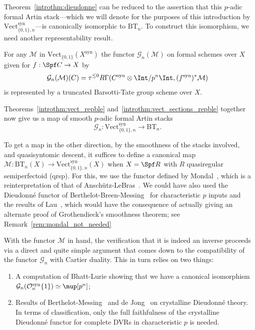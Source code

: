 \documentclass[10pt]{amsart}
\begin{document}
Theorem~\ref{introthm:dieudonne} can be reduced to the assertion that this $p$-adic formal Artin stack---which we will denote for the purposes of this introduction by $\mathrm{Vect}^{\mathrm{syn}}_{\{0,1\},n}$---is canonically isomorphic to $\mathrm{BT}_n$. To construct this isomorphism, we need another representability result.

\begin{introthm}
\label{introthm:vect_sections_repble}
For any $\mathcal{M}$ in $\mathrm{Vect}_{\{0,1\}}(X^{\mathrm{syn}})$ the functor $\mathcal{G}_n(\mathcal{M})$ on formal schemes over $X$ given for $f:\Spf C\to X$ by
\[
\mathcal{G}_n(\mathcal{M})(C) = \tau^{\le 0}R\Gamma(C^{\mathrm{syn}}\otimes\Int/p^n\Int,(f^{\mathrm{syn}})^*\mathcal{M})
\]
is represented by a truncated Barsotti-Tate group scheme over $X$.
\end{introthm} 

Theorems~\ref{introthm:vect_repble} and~\ref{introthm:vect_sections_repble} together now give us a map of smooth $p$-adic formal Artin stacks
\[
\mathcal{G}_n:\mathrm{Vect}^{\mathrm{syn}}_{\{0,1\},n}\to \mathrm{BT}_n.
\]

To get a map in the other direction, by the smoothness of the stacks involved, and quasisyntomic descent, it suffices to define a canonical map $\mathcal{M}:\mathrm{BT}_n(X)\to \mathrm{Vect}^{\mathrm{syn}}_{\{0,1\},n}(X)$ when $X = \Spf R$ with $R$ quasiregular semiperfectoid (qrsp). For this, we use the functor defined by Mondal~\cite{Mondal2024-cy}, which is a reinterpretation of that of Ansch\"utz-LeBras~\cite{MR4530092}. We could have also used the Dieudonn\'e functor of Berthelot-Breen-Messing~\cite{bbm:cris_ii} for characteristic $p$ inputs and the results of Lau~\cite{lau2018divided}, which would have the consequence of actually giving an alternate proof of Grothendieck's smoothness theorem; see Remark~\ref{rem:mondal_not_needed}

With the functor $\mathcal{M}$ in hand, the verification that it is indeed an inverse proceeds via a direct and quite simple argument that comes down to the compatibility of the functor $\mathcal{G}_n$ with Cartier duality. This in turn relies on two things:
\begin{enumerate}
   \item A computation of Bhatt-Lurie showing that we have a canonical isomorphism $\mathcal{G}_n(\mathcal{O}^{\mathrm{syn}}_n\{1\}) \simeq \mup[p^n]$;
   \item Results of Berthelot-Messing~\cite{Berthelot1990-gp} and de Jong~\cite{de-Jong1998-ki} on crystalline Dieudonn\'e theory. In terms of classification, only the full faithfulness of the crystalline Dieudonn\'e functor for complete DVRs in characteristic $p$ is needed.
\end{enumerate}
\end{document}
